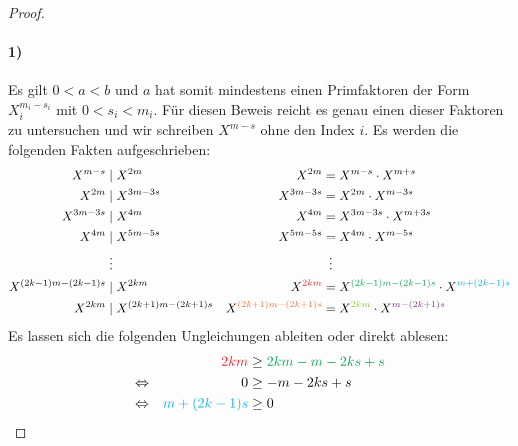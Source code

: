 \begin{proof}
  \paragraph{1)}
  Es gilt $0 < a < b$ und $a$ hat somit mindestens einen Primfaktoren
  der Form $X_i^{m_i - s_i}$ mit $0 < s_i < m_i$.
  Für diesen Beweis reicht es genau einen dieser Faktoren zu untersuchen und wir schreiben
  $X^{m - s}$ ohne den Index $i$. Es werden die folgenden Fakten aufgeschrieben:
  \begin{align*}
    X^{m - s}                                     & \mid X^{2m}                    & X^{2m}      & = X^{m - s} \cdot X^{m + s}    \\
    X^{2m}                                        & \mid X^{3m - 3s}               & X^{3m - 3s} & = X^{2m} \cdot X^{m - 3s}      \\
    X^{3m - 3s}                                   & \mid X^{4m}                    & X^{4m}      & = X^{3m - 3s} \cdot X^{m + 3s} \\
    X^{4m}                                        & \mid X^{5m - 5s}               & X^{5m - 5s} & = X^{4m} \cdot X^{m - 5s}      \\
                                                  & \vdotswithin{\mid}             &             & \vdotswithin{=}                \\
    X^{(2k - 1)m - (2k -1)s}                      & \mid X^{2km}                   &
    X^{\textcolor{Red}{2km}}                      &
    = X^{\textcolor{Green}{(2k - 1)m - (2k -1)s}} \cdot X^{\textcolor{Cyan}{m + (2k -1)s}}                                        \\
    X^{2km}                                       & \mid X^{(2k + 1)m - (2k + 1)s} &
    X^{\textcolor{Orange}{(2k + 1)m - (2k + 1)s}} &
    = X^{\textcolor{LimeGreen}{2km}} \cdot X^{\textcolor{Fuchsia}{m - (2k + 1)s}}
  \end{align*}
  Es lassen sich die folgenden Ungleichungen ableiten oder direkt ablesen:
  \begin{equation}
    \label{eq:33.4.1}
    \begin{aligned}
                      &  & \textcolor{Red}{2km}            & \geq \textcolor{Green}{2km - m - 2ks + s} \\
      \Leftrightarrow &  & 0                               & \geq -m - 2ks + s                         \\
      \Leftrightarrow &  & \textcolor{Cyan}{m + (2k - 1)s} & \geq 0
    \end{aligned}

\end{equation}
\end{proof}
